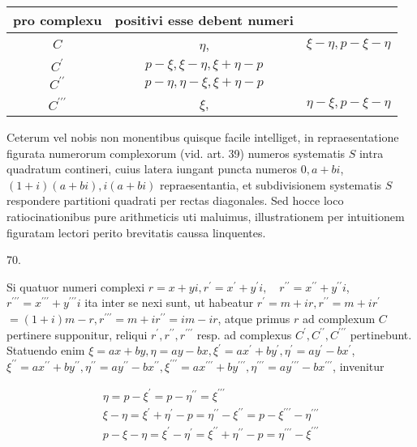 \documentclass[10pt]{article}
\begin{document}
\begin{center}
\begin{tabular}{c|cc}
pro complexu & positivi esse debent numeri &  \\
\hline
\(C\) & \(\eta\), & \(\xi-\eta, p-\xi-\eta\) \\
\(C^{\prime}\) & \(p-\xi, \xi-\eta, \xi+\eta-p\) &  \\
\(C^{\prime \prime}\) & \(p-\eta, \eta-\xi, \xi+\eta-p\) &  \\
\(C^{\prime \prime \prime}\) & \(\xi\), & \(\eta-\xi, p-\xi-\eta\) \\
\end{tabular}
\end{center}

Ceterum vel nobis non monentibus quisque facile intelliget, in repraesentatione figurata numerorum complexorum (vid. art. 39) numeros systematis \(S\) intra quadratum contineri, cuius latera iungant puncta numeros \(0, a+b i\), \((1+i)(a+b i), i(a+b i)\) repraesentantia, et subdivisionem systematis \(S\) respondere partitioni quadrati per rectas diagonales. Sed hocce loco ratiocinationibus pure arithmeticis uti maluimus, illustrationem per intuitionem figuratam lectori perito brevitatis caussa linquentes.

70.

Si quatuor numeri complexi \(r=x+y i, r^{\prime}=x^{\prime}+y^{\prime} i, \quad r^{\prime \prime}=x^{\prime \prime}+y^{\prime \prime} i\), \(r^{\prime \prime \prime}=x^{\prime \prime \prime}+y^{\prime \prime \prime} i\) ita inter se nexi sunt, ut habeatur \(r^{\prime}=m+i r, r^{\prime \prime}=m+i r^{\prime}\) \(=(1+i) m-r, r^{\prime \prime \prime}=m+i r^{\prime \prime}=i m-i r\), atque primus \(r\) ad complexum \(C\) pertinere supponitur, reliqui \(r^{\prime}, r^{\prime \prime}, r^{\prime \prime \prime}\) resp. ad complexus \(C^{\prime}, C^{\prime \prime}, C^{\prime \prime \prime}\) pertinebunt. Statuendo enim \(\xi=a x+b y, \eta=a y-b x, \xi^{\prime}=a x^{\prime}+b y^{\prime}, \eta^{\prime}=a y^{\prime}-b x^{\prime}\), \(\xi^{\prime \prime}=a x^{\prime \prime}+b y^{\prime \prime}, \eta^{\prime \prime}=a y^{\prime \prime}-b x^{\prime \prime}, \xi^{\prime \prime \prime}=a x^{\prime \prime \prime}+b y^{\prime \prime \prime}, \eta^{\prime \prime \prime}=a y^{\prime \prime \prime}-b x^{\prime \prime \prime}\), invenitur

\[
\begin{gathered}
\eta=p-\xi^{\prime}=p-\eta^{\prime \prime}=\xi^{\prime \prime \prime} \\
\xi-\eta=\xi^{\prime}+\eta^{\prime}-p=\eta^{\prime \prime}-\xi^{\prime \prime}=p-\xi^{\prime \prime \prime}-\eta^{\prime \prime \prime} \\
p-\xi-\eta=\xi^{\prime}-\eta^{\prime}=\xi^{\prime \prime}+\eta^{\prime \prime}-p=\eta^{\prime \prime \prime}-\xi^{\prime \prime \prime}
\end{gathered}
\]
\end{document}
